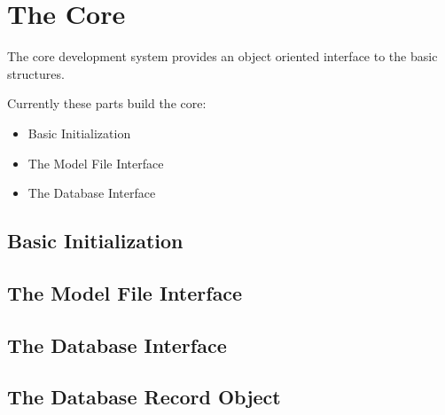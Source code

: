 \chapter{The \apiis{} Core}

The \apiis{} core development system provides an object oriented interface to
the basic structures.

Currently these parts build the core:
\begin{itemize}
   \item Basic Initialization
   \item The Model File Interface
   \item The Database Interface
\end{itemize}

\section{Basic Initialization}


\section{The Model File Interface}


\section{The Database Interface}


\section{The Database Record Object}



